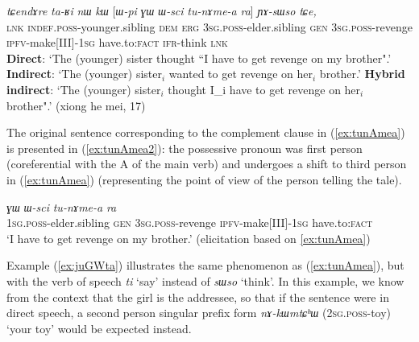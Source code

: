 \documentclass[oneside,a4paper,11pt]{article}
\newcommand{\ipa}[1]{\textit{\phon#1}}
\newcommand{\bleu}[1]{{\color{blue}#1}}
\newcommand{\rouge}[1]{{\color{red}#1}}
\newcommand{\refb}[1]{(\ref{#1})}
\begin{document}
\begin{exe}
\ex \label{ex:tunAmea}
\gll  \ipa{tɕendɤre}  	\ipa{ta-ʁi}  	\ipa{nɯ}  	\ipa{kɯ}  	[\rouge{\ipa{ɯ-pi}}  	\ipa{ɣɯ}  	\ipa{ɯ-sci}  	\bleu{\ipa{tu-nɤme-a}}  	\ipa{ra}] 	\ipa{ɲɤ-sɯso}  	\ipa{tɕe,}  	\\
\textsc{lnk}  \textsc{indef.poss}-younger.sibling \textsc{dem} \textsc{erg}  {\textsc{3sg.poss}-elder.sibling}  \textsc{gen} \textsc{3sg.poss}-revenge {\textsc{ipfv}-make[III]-\textsc{1sg}} have.to:\textsc{fact} \textsc{ifr}-think \textsc{lnk} \\
\glt  \textbf{Direct}: `The (younger) sister thought ``\bleu{I have to get revenge} on \bleu{my brother}".'
\glt  \textbf{Indirect}:  `The (younger) sister$_i$ \rouge{wanted to get revenge on her$_i$ brother}.'
\glt  \textbf{Hybrid indirect}:  `The (younger) sister$_i$ thought \bleu{I_i have to get revenge} on \rouge{her$_i$ brother}".' (xiong he mei, 17)
  \end{exe}
  
The original sentence corresponding to the complement clause in \refb{ex:tunAmea} is presented in \refb{ex:tunAmea2}: the possessive pronoun was first person (coreferential with the A of the main verb) and undergoes a shift to third person in \refb{ex:tunAmea} (representing the point of view of the person telling the tale).

  \begin{exe}
\ex \label{ex:tunAmea2}
\gll \bleu{\ipa{a-pi}}  	\ipa{ɣɯ}  	\ipa{ɯ-sci}  	\bleu{\ipa{tu-nɤme-a}}  	\ipa{ra}	\\
 {\textsc{1sg.poss}-elder.sibling}  \textsc{gen} \textsc{3sg.poss}-revenge {\textsc{ipfv}-make[III]-\textsc{1sg}} have.to:\textsc{fact}  \\
\glt `I have to get revenge on my brother.' (elicitation based on \ref{ex:tunAmea})
  \end{exe}
  
  Example \refb{ex:juGWta} illustrates the same phenomenon as \refb{ex:tunAmea}, but with the verb of speech \ipa{ti} `say' instead of \ipa{sɯso} `think'. In this example, we know from the context that the girl is the addressee, so that if the sentence were in direct speech, a second person singular prefix form \ipa{nɤ-kɯmtɕʰɯ} (\textsc{2sg.poss}-toy) `your toy' would be expected instead.
 
\end{document}
